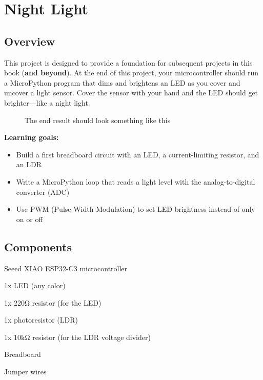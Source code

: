\chapter{Night Light}

\section{Overview}
This project is designed to provide a foundation for subsequent projects in this book (\textbf{and beyond}).
At the end of this project, your microcontroller should run a MicroPython program that dims and
brightens an LED as you cover and uncover a light sensor. Cover the sensor with your hand and the
LED should get brighter---like a night light.
\begin{figure}[H]
\centering
    \caption{The end result should look something like this}
\end{figure}

\begin{tcolorbox}[colback=blue!5!white,colframe=blue!40!black]
    \textbf{Learning goals:}
    \begin{itemize}
        \item Build a first breadboard circuit with an LED, a current-limiting resistor, and an LDR
        \item Write a MicroPython loop that reads a light level with the analog-to-digital converter (ADC)
        \item Use PWM (Pulse Width Modulation) to set LED brightness instead of only on or off
    \end{itemize}
\end{tcolorbox}

\pagebreak

\section{Components}
\begin{components}
    \item Seeed XIAO ESP32-C3 microcontroller
    \item 1x LED (any color)
    \item 1x 220\si{\ohm} resistor (for the LED)
    \item 1x photoresistor (LDR)
    \item 1x 10\si{\kilo\ohm} resistor (for the LDR voltage divider)
    \item Breadboard
    \item Jumper wires
\end{components}


